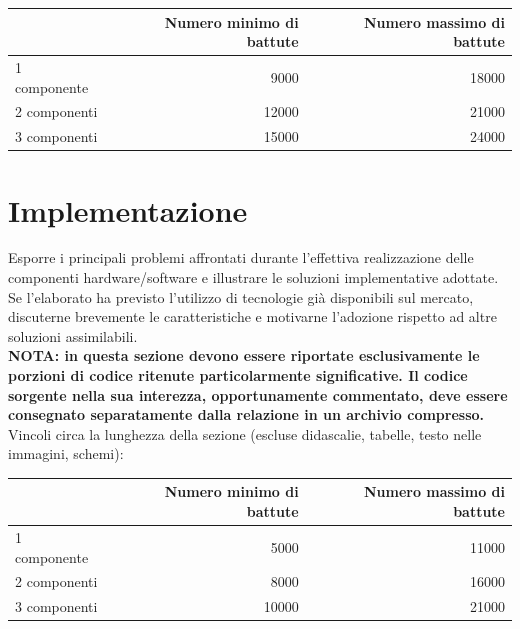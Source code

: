 \documentclass[12pt]{article}
\begin{document}
\vspace{1cm}
\begin{tabular}{l|rr}
 & Numero minimo di battute & Numero massimo di battute \\
 \hline
 1 componente & 9000 & 18000 \\
 2 componenti & 12000 & 21000 \\
 3 componenti & 15000 & 24000 \\
 \hline
\end{tabular}


\newpage



\section{Implementazione}\label{sec:implementazione}

Esporre i principali problemi affrontati durante l'effettiva realizzazione delle componenti hardware/software e illustrare le soluzioni implementative adottate. Se l'elaborato ha previsto l'utilizzo di tecnologie già disponibili sul mercato, discuterne brevemente le caratteristiche e motivarne l'adozione rispetto ad altre soluzioni assimilabili.\\

\textbf{NOTA: in questa sezione devono essere riportate esclusivamente le porzioni di codice ritenute particolarmente significative. Il codice sorgente nella sua interezza, opportunamente commentato, deve essere consegnato separatamente dalla relazione in un archivio compresso.}\\


Vincoli circa la lunghezza della sezione (escluse didascalie, tabelle, testo nelle immagini, schemi):

\vspace{1cm}
\begin{tabular}{l|rr}
 & Numero minimo di battute & Numero massimo di battute \\
 \hline
 1 componente & 5000 & 11000 \\
 2 componenti & 8000 & 16000 \\
 3 componenti & 10000 & 21000 \\
 \hline
\end{tabular}


\newpage
\end{document}
